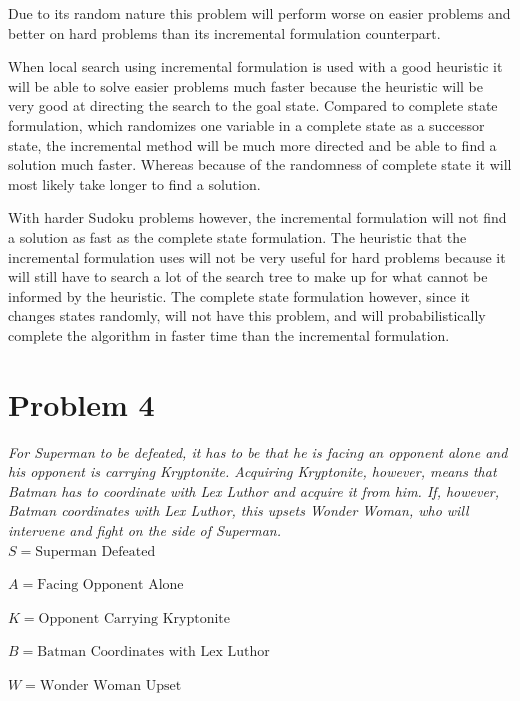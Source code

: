 \documentclass[10pt,a4paper]{article}
\begin{document}
\begin{enumerate}[A.]
		Due to its random nature this problem will perform worse on easier problems and better on hard problems than its incremental formulation counterpart.
		
		When local search using incremental formulation is used with a good heuristic it will be able to solve easier problems much faster because the heuristic will be very good at directing the search to the goal state. Compared to complete state formulation, which randomizes one variable in a complete state as a successor state, the incremental method will be much more directed and be able to find a solution much faster. Whereas because of the randomness of complete state it will most likely take longer to find a solution.
		
		With harder Sudoku problems however, the incremental formulation will not find a solution as fast as the complete state formulation. The heuristic that the incremental formulation uses will not be very useful for hard problems because it will still have to search a lot of the search tree to make up for what cannot be informed by the heuristic. The complete state formulation however, since it changes states randomly, will not have this problem, and will probabilistically complete the algorithm in faster time than the incremental formulation.
		
	\end{enumerate}
    
	\section*{Problem 4}
	
	\textit{For Superman to be defeated, it has to be that he is facing an opponent alone and his opponent is carrying Kryptonite. Acquiring Kryptonite, however, means that Batman has to coordinate with Lex Luthor and acquire it from him. If, however, Batman coordinates with Lex Luthor, this upsets Wonder Woman, who will intervene and fight on the side of Superman.}\\
	
	
	$S = \text{Superman Defeated}$
	
	$A = \text{Facing Opponent Alone}$	
	
	$K = \text{Opponent Carrying Kryptonite}$
	
	$B = \text{Batman Coordinates with Lex Luthor}$
	
	$W = \text{Wonder Woman Upset}$
\end{document}
